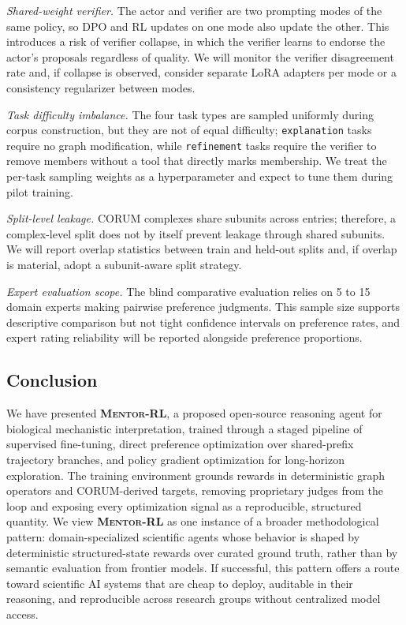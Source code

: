 \documentclass[thesis,letterpaper,12pt]{utthesis}
\begin{document}
\textit{Shared-weight verifier.} The actor and verifier are two prompting modes of the same policy, so DPO and RL updates on one mode also update the other. This introduces a risk of verifier collapse, in which the verifier learns to endorse the actor's proposals regardless of quality. We will monitor the verifier disagreement rate and, if collapse is observed, consider separate LoRA adapters per mode or a consistency regularizer between modes.

\textit{Task difficulty imbalance.} The four task types are sampled uniformly during corpus construction, but they are not of equal difficulty; \texttt{explanation} tasks require no graph modification, while \texttt{refinement} tasks require the verifier to remove members without a tool that directly marks membership. We treat the per-task sampling weights as a hyperparameter and expect to tune them during pilot training.

\textit{Split-level leakage.} CORUM complexes share subunits across entries; therefore, a complex-level split does not by itself prevent leakage through shared subunits. We will report overlap statistics between train and held-out splits and, if overlap is material, adopt a subunit-aware split strategy.

\textit{Expert evaluation scope.} The blind comparative evaluation relies on 5 to 15 domain experts making pairwise preference judgments. This sample size supports descriptive comparison but not tight confidence intervals on preference rates, and expert rating reliability will be reported alongside preference proportions.

\subsection{Conclusion}
We have presented \textbf{\textsc{Mentor-RL}}, a proposed open-source reasoning agent for biological mechanistic interpretation, trained through a staged pipeline of supervised fine-tuning, direct preference optimization over shared-prefix trajectory branches, and policy gradient optimization for long-horizon exploration. The training environment grounds rewards in deterministic graph operators and CORUM-derived targets, removing proprietary judges from the loop and exposing every optimization signal as a reproducible, structured quantity. We view \textbf{\textsc{Mentor-RL}} as one instance of a broader methodological pattern: domain-specialized scientific agents whose behavior is shaped by deterministic structured-state rewards over curated ground truth, rather than by semantic evaluation from frontier models. If successful, this pattern offers a route toward scientific AI systems that are cheap to deploy, auditable in their reasoning, and reproducible across research groups without centralized model access.

\printbibliography
\end{document}
